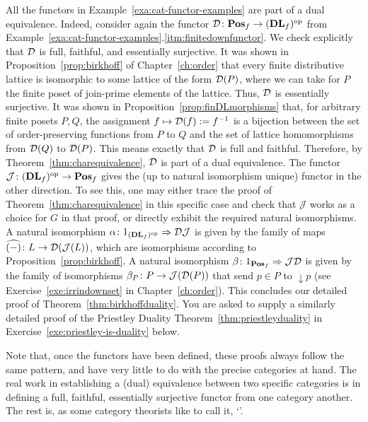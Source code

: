 \begin{example}\label{exa:cat-duality-examples}
  All the functors in Example~\ref{exa:cat-functor-examples} are part of a dual equivalence. Indeed, consider again the functor $\mathcal{D} \colon \mathbf{Pos}_f \to (\mathbf{DL}_f)^{\mathrm{op}}$ from Example~\ref{exa:cat-functor-examples}.\ref{itm:finitedownfunctor}. We check explicitly that $\mathcal{D}$ is full, faithful, and essentially surjective. It was shown in Proposition~\ref{prop:birkhoff} of Chapter~\ref{ch:order} that every finite distributive lattice is isomorphic to some lattice of the form $\mathcal{D}(P)$, where we can take for $P$ the finite poset of join-prime elements of the lattice. Thus, $\mathcal{D}$ is essentially surjective. It was shown in Proposition~\ref{prop:finDLmorphisms} that, for arbitrary finite posets $P, Q$, the assignment $f \mapsto \mathcal{D}(f) := f^{-1}$ is a bijection between the set of order-preserving functions from $P$ to $Q$ and the set of lattice homomorphisms from $\mathcal{D}(Q)$ to $\mathcal{D}(P)$. This means exactly that $\mathcal{D}$ is full and faithful. Therefore, by Theorem~\ref{thm:charequivalence}, $\mathcal{D}$ is part of a dual equivalence. The functor $\mathcal{J} \colon (\mathbf{DL}_f)^{\mathrm{op}} \to \mathbf{Pos}_f$ gives the (up to natural isomorphism unique) functor in the other direction. To see this, one may either trace the proof of Theorem~\ref{thm:charequivalence} in this specific case and check that $\mathcal{J}$ works as a choice for $G$ in that proof, or directly exhibit the required natural isomorphisms. A natural isomorphism $\alpha \colon 1_{(\mathbf{DL}_f)^{\mathrm{op}}} \Rightarrow \mathcal{D} \mathcal{J}$ is given by the family of maps $\widehat{(-)} \colon L \to \mathcal{D}(\mathcal{J}(L))$, which are isomorphisms according to Proposition~\ref{prop:birkhoff}. 
A natural isomorphism $\beta \colon 1_{\mathbf{Pos}_f} \Rightarrow \mathcal{J} \mathcal{D}$ is given by the family of isomorphisms $\beta_P \colon P \to \mathcal{J} (\mathcal{D}(P))$ that send $p \in P$ to ${\downarrow} p$ (see Exercise~\ref{exe:irrindownset} in Chapter~\ref{ch:order}). This concludes our detailed proof of Theorem~\ref{thm:birkhoffduality}. You are asked to supply a similarly detailed proof of the Priestley Duality Theorem~\ref{thm:priestleyduality} in Exercise~\ref{exe:priestley-is-duality} below.

Note that, once the functors have been defined,  these proofs always follow the same pattern, and have very little to do with the precise categories at hand. The real work in establishing a (dual) equivalence between two specific categories is in defining a full, faithful, essentially surjective functor from one category another. The rest is, as some category theorists like to call it, `'.
\end{example}

